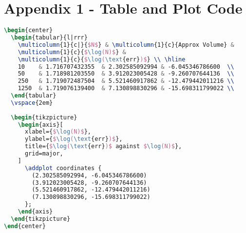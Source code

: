 \documentclass[a4paper,12pt]{report}
\begin{document}
\section*{Appendix 1 - Table and Plot Code}
\begin{lstlisting}[language=TeX]
\begin{center}
  \begin{tabular}{l|rrr}
    \multicolumn{1}{c|}{$N$} & \multicolumn{1}{c}{Approx Volume} &
    \multicolumn{1}{c}{$\log(N)$} &
    \multicolumn{1}{c}{$\log(\text{err})$} \\ \hline
    10    & 1.716707432355  & 2.302585092994 & -6.045346786600  \\
    50    & 1.718981203550  & 3.912023005428 & -9.260707644136  \\
    250   & 1.719072487504  & 5.521460917862 & -12.479442011216 \\
    1250  & 1.719076139400  & 7.130898830296 & -15.698311799022 \\
  \end{tabular}
  \vspace{2em}
  
  \begin{tikzpicture}
    \begin{axis}[
      xlabel={$\log(N)$},
      ylabel={$\log(\text{err})$},
      title={$\log(\text{err})$ against $\log(N)$},
      grid=major,
    ]
      \addplot coordinates {
        (2.302585092994, -6.045346786600)
        (3.912023005428, -9.260707644136)
        (5.521460917862, -12.479442011216)
        (7.130898830296, -15.698311799022)
      };
    \end{axis}
  \end{tikzpicture}
\end{center}
\end{lstlisting}
\end{document}
